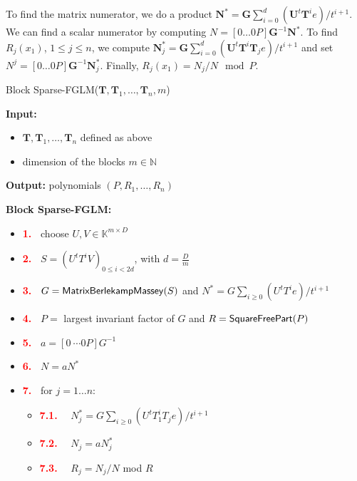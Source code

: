\documentclass[12pt]{article}
\def\mG{\mathbf{G}}
\def\mN{\mathbf{N}}
\def\mT{\mathbf{T}}
\def\mU{\mathbf{U}}
\begin{document}
To find the matrix numerator, we do a product 
$\mN^* = \mG\sum_{i=0}^{d} (\mU^t \mT^i e)/ t^{i+1}$. We can find a
scalar numerator by computing $N =  [0 \dots 0 P] \mG^{-1} \mN^*$. To find $R_j(x_1)$, $1 \le j \le n$,
we compute 
$\mN^*_j = \mG \sum_{i=0}^{d} (\mU^t \mT^i \mT_j e) / {t^{i+1}}$
and set $N^j =
[0 \dots 0 P] \mG^{-1} \mN^*_j$. Finally, $R_j(x_1) = N_j / N \mod P$.

\begin{algorithm}
	\caption{Block Sparse-FGLM($\mT,\mT_1,\dots,\mT_n,m$)}
	{\bf Input:} \vspace{-0.5em}
	\begin{itemize}
		\item $\mT,\mT_1,\dots,\mT_n$ defined as above
		\item dimension of the blocks $m \in \mathbb{N}$
	\end{itemize}
	{\bf Output:} polynomials $(P,R_1,\dots,R_n)$
\end{algorithm}

\begin{center}
	\textbf{Block Sparse-FGLM:}
	\begin{itemize}
		\item[]\textcolor{red}{\bf 1.~} {\sf choose $U,V \in \mathbb{K}^{m \times D}$}
		\item[]\textcolor{red}{\bf 2.~} {\sf $S= (U^tT^iV)_{0 \le i < 2d}$, with $d = \frac{D}{m}$}
		\item[]\textcolor{red}{\bf 3.~} {\sf $G = {\sf MatrixBerlekampMassey}(S)$ and 
			$N^* = G\sum_{i\ge 0} {(U^tT^ie)}/{t^{i+1}}$}
		\item[]\textcolor{red}{\bf 4.~} {\sf $P=$ largest invariant factor of $G$ and $R={\sf SquareFreePart}(P)$}
		\item[]\textcolor{red}{\bf 5.~} {\sf $a = [0 ~\cdots 0 P] G^{-1}$}
		\item[]\textcolor{red}{\bf 6.~} {\sf $N=aN^*$}
		\item[]\textcolor{red}{\bf 7.~} {\sf for $j = 1 \dots n$:}
		\begin{itemize}
			\item[]\textcolor{red}{\bf 7.1.} ~~{\sf	$N_j^* = G\sum_{i\ge 0} {(U^tT_1^i T_j e)}/{t^{i+1}}$}
			\item[]\textcolor{red}{\bf 7.2.} ~~{\sf $N_j=aN_j^*$}
			\item[]\textcolor{red}{\bf 7.3.} ~~{\sf $R_j=N_j/N$ mod $R$}
		\end{itemize}
	\end{itemize}
\end{center}
\end{document}
